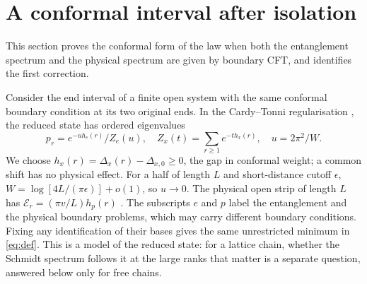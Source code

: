 \documentclass[11pt,a4paper]{article}
\theoremstyle{remark}
\begin{document}
\section{A conformal interval after isolation}\label{sec:cft}
This section proves the conformal form of the law when both the entanglement spectrum and the physical spectrum are given by boundary CFT, and identifies the first correction.

Consider the end interval of a finite open system with the same conformal boundary condition at its two original ends. In the Cardy--Tonni regularisation \cite{tonni,alba}, the reduced state has ordered eigenvalues
\[
 p_r=e^{-u h_e(r)}/Z_e(u),\quad Z_x(t)=\sum_{r\ge1}e^{-t h_x(r)},\quad u=2\pi^2/W .
\]
We choose $h_x(r)=\Delta_x(r)-\Delta_{x,0}\ge0$, the gap in conformal weight; a common shift has no physical effect. For a half of length $L$ and short-distance cutoff $\epsilon$, $W=\log[4L/(\pi\epsilon)]+o(1)$, so $u\to0$. The physical open strip of length $L$ has $\mathcal E_r=(\pi v/L)h_p(r)$ \cite{cardy}. The subscripts $e$ and $p$ label the entanglement and the physical boundary problems, which may carry different boundary conditions. Fixing any identification of their bases gives the same unrestricted minimum in \eqref{eq:def}. This is a model of the reduced state: for a lattice chain, whether the Schmidt spectrum follows it at the large ranks that matter is a separate question, answered below only for free chains.
\end{document}
